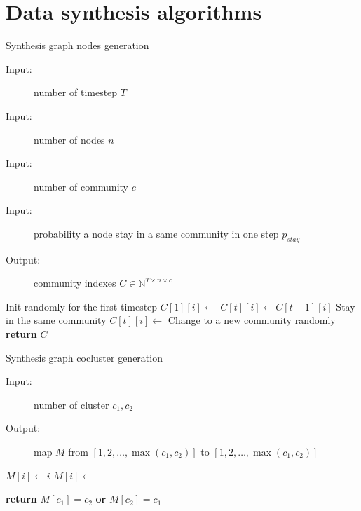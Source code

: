 \chapter{Data synthesis algorithms}

\begin{algorithm}
	\noindent
	\caption{Synthesis graph nodes generation}
	\label{alg:appendix-synthesis_graph_nodes}
	\begin{description}
		\item[Input:] number of timestep $T$
		\item[Input:] number of nodes $n$
		\item[Input:] number of community $c$
		\item[Input:] probability a node stay in a same community in one step $p_{stay}$
		\item[Output:] community indexes $C \in \mathbb{N}^{T \times n \times c}$
	\end{description}
	\begin{algorithmic}[1]
		\Comment Init randomly for the first timestep
		\State $C[1][i] \gets$ 
		\EndFor
		\State $C[t][i] \gets C[t-1][i]$
		\Comment Stay in the same community
		\Else
		\State $C[t][i] \gets$ 
		\Comment Change to a new community randomly
		\EndIf
		\EndFor
		\EndFor
		\State \textbf{return} $C$
		\EndFunction
	\end{algorithmic}
\end{algorithm}


\begin{algorithm}
	\caption{Synthesis graph cocluster generation}
	\label{alg:appendix-synthesis_graph_cocluster}
	\begin{description}
		\item[Input:] number of cluster $c_1, c_2$
		\item[Output:] map $M$ from $[1, 2, \ldots, \max(c_1, c_2)]$ to $[1, 2, \ldots, \max(c_1, c_2)]$
	\end{description}
	\begin{algorithmic}[1]
		\State $M[i] \gets i$
		\EndFor
		\State $M[i] \gets$ 
		\EndFor
		\EndFunction
	\end{algorithmic}
	\begin{algorithmic}[1]
		\State \textbf{return} $M[c_1] = c_2$ \textbf{or} $M[c_2] = c_1$
		\EndFunction
	\end{algorithmic}
\end{algorithm}


